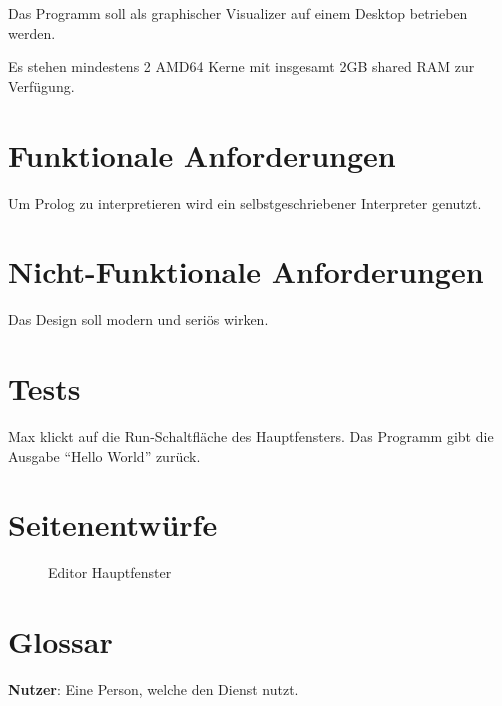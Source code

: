 \documentclass[parskip=full,11pt,twoside]{scrartcl}
\begin{document}
Das Programm soll als graphischer Visualizer auf einem Desktop betrieben werden.

Es stehen mindestens 2 AMD64 Kerne mit insgesamt 2GB shared RAM zur Verfügung.

\section{Funktionale Anforderungen}


Um Prolog zu interpretieren wird ein selbstgeschriebener Interpreter genutzt.

\section{Nicht-Funktionale Anforderungen}


Das Design soll modern und seriös wirken.

\section{Tests}


{Max klickt auf die Run-Schaltfläche des Hauptfensters.}
{Das Programm gibt die Ausgabe \enquote{Hello World} zurück.}

\pagebreak
\appendix

\section{Seitenentwürfe}

\begin{figure}[hb]
\caption{\label{fig:editor}
Editor Hauptfenster
}
\end{figure}

\section{Glossar}

\textbf{Nutzer}:
Eine Person, welche den Dienst nutzt.
\end{document}
